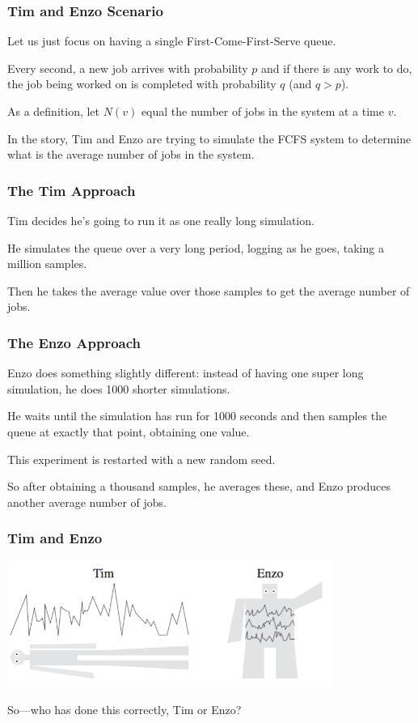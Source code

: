 \begin{frame}
\frametitle{Tim and Enzo Scenario}

Let us just focus on having a single First-Come-First-Serve queue. 

Every second, a new job arrives with probability $p$ and if there is any work to do, the job being worked on is completed with probability $q$ (and $q > p$). 

As a definition, let $N(v)$ equal the number of jobs in the system at a time $v$. 

In the story, Tim and Enzo are trying to simulate the FCFS system to determine what is the average number of jobs in the system.

\end{frame}



\begin{frame}
\frametitle{The Tim Approach}

Tim decides he's going to run it as one really long simulation. 

He simulates the queue over a very long period, logging as he goes, taking a million samples. 

Then he takes the average value over those samples to get the average number of jobs.

\end{frame}



\begin{frame}
\frametitle{The Enzo Approach}

Enzo does something slightly different: instead of having one super long simulation, he does 1000 shorter simulations. 

He waits until the simulation has run for 1000 seconds and then samples the queue at exactly that point, obtaining one value. 

This experiment is restarted with a new random seed. 

So after obtaining a thousand samples, he averages these, and Enzo produces another average number of jobs.


\end{frame}



\begin{frame}
\frametitle{Tim and Enzo}

\begin{center}
	\includegraphics[width=0.8\textwidth]{images/timenzo.png}
\end{center}

So---who has done this correctly, Tim or Enzo?

\end{frame}



